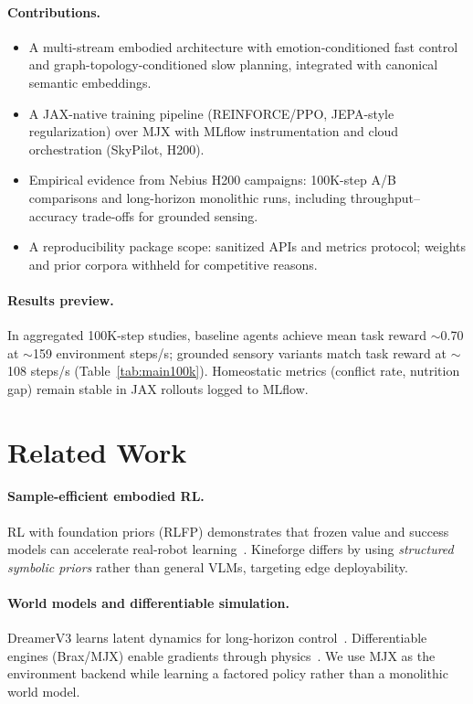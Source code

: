 \documentclass[11pt,a4paper]{article}
\begin{document}
\paragraph{Contributions.}
\begin{itemize}
  \item A multi-stream embodied architecture with emotion-conditioned fast control and graph-topology-conditioned slow planning, integrated with canonical semantic embeddings.
  \item A JAX-native training pipeline (REINFORCE/PPO, JEPA-style regularization) over MJX with MLflow instrumentation and cloud orchestration (SkyPilot, H200).
  \item Empirical evidence from Nebius H200 campaigns: 100K-step A/B comparisons and long-horizon monolithic runs, including throughput--accuracy trade-offs for grounded sensing.
  \item A reproducibility package scope: sanitized APIs and metrics protocol; weights and prior corpora withheld for competitive reasons.
\end{itemize}

\paragraph{Results preview.}
In aggregated 100K-step studies, baseline agents achieve mean task reward ${\sim}$0.70 at ${\sim}$159 environment steps/s; grounded sensory variants match task reward at ${\sim}$108 steps/s (Table~\ref{tab:main100k}). Homeostatic metrics (conflict rate, nutrition gap) remain stable in JAX rollouts logged to MLflow.

\section{Related Work}
\label{sec:related}

\paragraph{Sample-efficient embodied RL.}
RL with foundation priors (RLFP) demonstrates that frozen value and success models can accelerate real-robot learning~\cite{ye2024rlfp}. Kineforge differs by using \emph{structured symbolic priors} rather than general VLMs, targeting edge deployability.

\paragraph{World models and differentiable simulation.}
DreamerV3 learns latent dynamics for long-horizon control~\cite{hafner2023dreamerv3}. Differentiable engines (Brax/MJX) enable gradients through physics~\cite{freeman2021mjx}. We use MJX as the environment backend while learning a factored policy rather than a monolithic world model.
\end{document}
